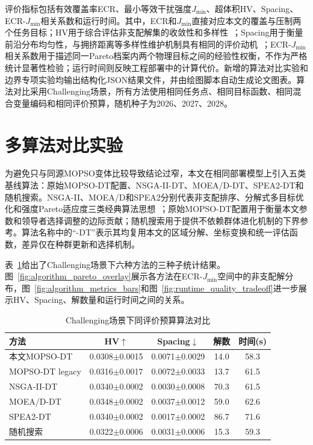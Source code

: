 评价指标包括有效覆盖率ECR、最小等效干扰强度$J_{\min}$、超体积HV、Spacing、ECR-$J_{\min}$相关系数和运行时间。其中，ECR和$J_{\min}$直接对应本文的覆盖与压制两个任务目标；HV用于综合评估非支配解集的收敛性和多样性~\cite{Zitzler2001}；Spacing用于衡量前沿分布均匀性，与拥挤距离等多样性维护机制具有相同的评价动机~\cite{Deb2002,Raquel2005}；ECR-$J_{\min}$相关系数用于描述同一Pareto档案内两个物理目标之间的经验性权衡，不作为严格统计显著性检验；运行时间则反映工程部署中的计算代价。新增的算法对比实验和边界专项实验均输出结构化JSON结果文件，并由绘图脚本自动生成论文图表。算法对比采用Challenging场景，所有方法使用相同任务点、相同目标函数、相同混合变量编码和相同评价预算，随机种子为2026、2027、2028。

\section{多算法对比实验}

为避免只与同源MOPSO变体比较导致结论过窄，本文在相同部署模型上引入五类基线算法：原始MOPSO-DT配置、NSGA-II-DT、MOEA/D-DT、SPEA2-DT和随机搜索。NSGA-II、MOEA/D和SPEA2分别代表非支配排序、分解式多目标优化和强度Pareto适应度三类经典算法思想~\cite{Deb2002,Zhang2007,Zitzler2001}；原始MOPSO-DT配置用于衡量本文参数和领导者选择调整的边际贡献；随机搜索用于提供不依赖群体进化机制的下界参考。算法名称中的``-DT''表示其均复用本文的区域分解、坐标变换和统一评估函数，差异仅在种群更新和选择机制。

表~\ref{tab:algorithm_comparison}给出了Challenging场景下六种方法的三种子统计结果。图~\ref{fig:algorithm_pareto_overlay}展示各方法在ECR-$J_{\min}$空间中的非支配解分布，图~\ref{fig:algorithm_metrics_bars}和图~\ref{fig:runtime_quality_tradeoff}进一步展示HV、Spacing、解数量和运行时间之间的关系。

\begin{table}[!htbp]
\centering
\small
\caption{Challenging场景下同评价预算算法对比}
\label{tab:algorithm_comparison}
\begin{tabular}{lcccc}
\toprule
方法 & HV$\uparrow$ & Spacing$\downarrow$ & 解数 & 时间(s) \\
\midrule
本文MOPSO-DT & 0.0308$\pm$0.0015 & 0.0071$\pm$0.0029 & 14.0 & 58.3 \\
MOPSO-DT legacy & 0.0316$\pm$0.0017 & 0.0072$\pm$0.0033 & 13.7 & 61.5 \\
NSGA-II-DT & 0.0340$\pm$0.0002 & 0.0030$\pm$0.0008 & 70.3 & 61.5 \\
MOEA/D-DT & 0.0348$\pm$0.0002 & 0.0037$\pm$0.0012 & 59.0 & 62.6 \\
SPEA2-DT & 0.0340$\pm$0.0002 & 0.0017$\pm$0.0002 & 86.7 & 71.6 \\
随机搜索 & 0.0322$\pm$0.0006 & 0.0031$\pm$0.0006 & 15.3 & 59.3 \\
\bottomrule
\end{tabular}
\end{table}


